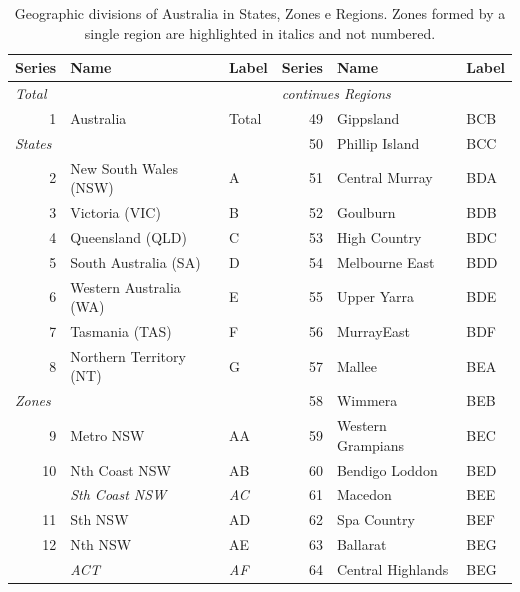 \documentclass[a4paper,11pt]{article}
\theoremstyle{definition}
\begin{document}
\begin{table}[H]
	\caption{Geographic divisions of Australia in States, Zones e Regions. Zones formed by a single region are highlighted in italics and not numbered.}
	\label{tab:australia}
	\fontsize{9}{10}\selectfont
	\centering
	\begin{tabular}{r l l|r l l}
		\toprule
		\textbf{Series}                      & \textbf{Name} & \textbf{Label} & \textbf{Series}   & \textbf{Name}         & \textbf{Label} \\
		\midrule
		\multicolumn{1}{l}{\textit{Total}}   &     &      & \multicolumn{3}{l}{\textit{continues Regions}}  \\
		1      & Australia     & Total          & 49      & Gippsland   & BCB  \\
		\cline{1-3}
		\multicolumn{1}{l}{\textit{States}}  &     &      & 50      & Phillip Island        & BCC  \\
		2      & New South Wales (NSW)   & A    & 51      & Central Murray        & BDA  \\
		3      & Victoria (VIC)          & B    & 52      & Goulburn    & BDB  \\
		4      & Queensland (QLD)        & C    & 53      & High Country          & BDC  \\
		5      & South Australia (SA)    & D    & 54      & Melbourne East        & BDD  \\
		6      & Western Australia (WA)  & E    & 55      & Upper Yarra & BDE  \\
		7      & Tasmania (TAS)          & F    & 56      & MurrayEast  & BDF  \\
		8      & Northern Territory (NT) & G    & 57      & Mallee      & BEA  \\
		\cline{1-3}
		\multicolumn{1}{l}{\textit{Zones}}   &     &      & 58      & Wimmera     & BEB  \\
		9      & Metro NSW     & AA   & 59      & Western Grampians     & BEC  \\
		10     & Nth Coast NSW & AB   & 60      & Bendigo Loddon        & BED  \\
		       & \textit{Sth Coast NSW}  & \textit{AC}    & 61      & Macedon     & BEE  \\
		11     & Sth NSW       & AD   & 62      & Spa Country & BEF  \\
		12     & Nth NSW       & AE   & 63      & Ballarat    & BEG  \\
		       & \textit{ACT}  & \textit{AF}    & 64      & Central Highlands     & BEG  \\

\end{tabular}
\end{table}
\end{document}
